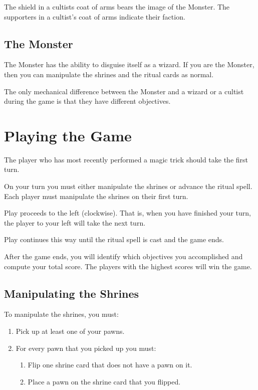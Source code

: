 \documentclass[10pt, parskip=half-, twoside]{scrartcl}
\begin{document}
The shield in a cultists coat of arms bears the image of the Monster. The supporters in a cultist's coat of arms indicate their faction.

\subsection*{The Monster}
The Monster has the ability to disguise itself as a wizard. If you are the Monster, then you can manipulate the shrines and the ritual cards as normal.

The only mechanical difference between the Monster and a wizard or a cultist during the game is that they have different objectives.

\newpage

\section*{Playing the Game}
The player who has most recently performed a magic trick should take the first turn.

On your turn you must either manipulate the shrines or advance the ritual spell. Each player must manipulate the shrines on their first turn.

Play proceeds to the left (clockwise). That is, when you have finished your turn, the player to your left will take the next turn.

Play continues this way until the ritual spell is cast and the game ends.

After the game ends, you will identify which objectives you accomplished and compute your total score. The players with the highest scores will win the game.

\newpage
 
\subsection*{Manipulating the Shrines}
To manipulate the shrines, you must:
\begin{enumerate}
\item Pick up at least one of your pawns.
\item For every pawn that you picked up you must:
	\begin{enumerate}
	\item Flip one shrine card that does not have a pawn on it.
	\item Place a pawn on the shrine card that you flipped.
	\end{enumerate}
\end{enumerate}
\end{document}
